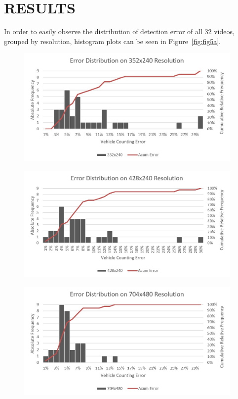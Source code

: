 \documentclass[article,12pt,a4paper,oneside,hidelinks]{memoir}
\begin{document}
\section{RESULTS}
In order to easily observe the distribution of detection error of all 32 videos, grouped by resolution, histogram plots can be seen in Figure~\ref{fig:fig5a}.

\begin{figure}[!htbp]
	\begin{minipage}[t]{0.5\textwidth}		
		\centering
		\includegraphics[width=0.985\textwidth]{Figuras/graf1.jpg}
		\label{fig:sub:subfigure5aa}
		\vspace{0.025\textwidth}
	\end{minipage}
	\hspace{\fill}
	\begin{minipage}[t]{0.5\textwidth}
		\centering
		\includegraphics[width=0.985\textwidth]{Figuras/graf2.jpg}
		\label{fig:sub:subfigure5ab}
		\vspace{0.025\textwidth}
	\end{minipage}
	\begin{minipage}[t]{0.5\textwidth}
		\centering
		\includegraphics[width=0.985\textwidth]{Figuras/graf3.jpg}

\end{minipage}
\end{figure}
\end{document}

